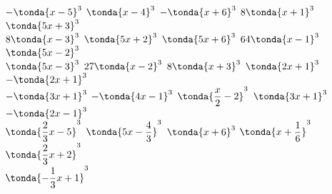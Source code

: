 \begin{esercizio}
\begin{htmulticols}{2}
\begin{enumeratea}
\end{enumeratea}
\end{htmulticols}
\noindent\! \(- \tonda{x - 5}^{3}\) %
 \(\tonda{x - 4}^{3}\) %
 \(- \tonda{x + 6}^{3}\) %
 \(8 \tonda{x + 1}^{3}\) %
 \(\tonda{5 x + 3}^{3}\) \\ %
 \(8 \tonda{x - 3}^{3}\) %
 \(\tonda{5 x + 2}^{3}\) %
 \(\tonda{5 x + 6}^{3}\) %
 \(64 \tonda{x - 1}^{3}\) %
 \(\tonda{5 x - 2}^{3}\) \\ %
 \(\tonda{5 x - 3}^{3}\) %
 \(27 \tonda{x - 2}^{3}\) %
 \(8 \tonda{x + 3}^{3}\) %
 \(\tonda{2 x + 1}^{3}\) %
 \(- \tonda{2 x + 1}^{3}\) \\ %
 \(- \tonda{3 x + 1}^{3}\) %
 \(- \tonda{4 x - 1}^{3}\) %
 \(\tonda{\dfrac{x}{2} - 2}^{3}\) %
 \(\tonda{3 x + 1}^{3}\) %
 \(- \tonda{2 x - 1}^{3}\) \\ %
 \(\tonda{\dfrac{2}{3} x - 5}^{3}\) %
 \(\tonda{5 x - \dfrac{4}{3}}^{3}\) %
 \(\tonda{x + 6}^{3}\) %
 \(\tonda{x + \dfrac{1}{6}}^{3}\) %
 \(\tonda{\dfrac{2}{3}x + 2}^{3}\) \\ %
 \(\tonda{-\dfrac{1}{3}x +1}^{3}\) %
\end{esercizio}

